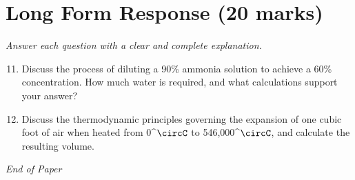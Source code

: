 \documentclass[12pt]{article}
\begin{document}
\section*{Long Form Response (20 marks)}
\textit{Answer each question with a clear and complete explanation.}
\begin{enumerate}[label=\arabic*.]
\setcounter{enumi}{10}
\item Discuss the process of diluting a 90\% ammonia solution to achieve a 60\% concentration. How much water is required, and what calculations support your answer?
\item Discuss the thermodynamic principles governing the expansion of one cubic foot of air when heated from 0^\ensuremath{\circC} to 546,000^\ensuremath{\circC}, and calculate the resulting volume.
\end{enumerate}

\vfill
\noindent\textit{End of Paper}
\end{document}
